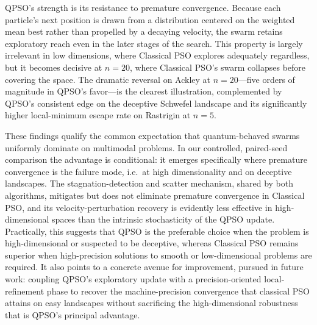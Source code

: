 QPSO's strength is its resistance to premature convergence. Because each particle's next position is drawn from a distribution centered on the weighted mean best rather than propelled by a decaying velocity, the swarm retains exploratory reach even in the later stages of the search. This property is largely irrelevant in low dimensions, where Classical PSO explores adequately regardless, but it becomes decisive at $n = 20$, where Classical PSO's swarm collapses before covering the space. The dramatic reversal on Ackley at $n = 20$---five orders of magnitude in QPSO's favor---is the clearest illustration, complemented by QPSO's consistent edge on the deceptive Schwefel landscape and its significantly higher local-minimum escape rate on Rastrigin at $n = 5$.

These findings qualify the common expectation that quantum-behaved swarms uniformly dominate on multimodal problems. In our controlled, paired-seed comparison the advantage is conditional: it emerges specifically where premature convergence is the failure mode, i.e.\ at high dimensionality and on deceptive landscapes. The stagnation-detection and scatter mechanism, shared by both algorithms, mitigates but does not eliminate premature convergence in Classical PSO, and its velocity-perturbation recovery is evidently less effective in high-dimensional spaces than the intrinsic stochasticity of the QPSO update. Practically, this suggests that QPSO is the preferable choice when the problem is high-dimensional or suspected to be deceptive, whereas Classical PSO remains superior when high-precision solutions to smooth or low-dimensional problems are required. It also points to a concrete avenue for improvement, pursued in future work: coupling QPSO's exploratory update with a precision-oriented local-refinement phase to recover the machine-precision convergence that classical PSO attains on easy landscapes without sacrificing the high-dimensional robustness that is QPSO's principal advantage.
